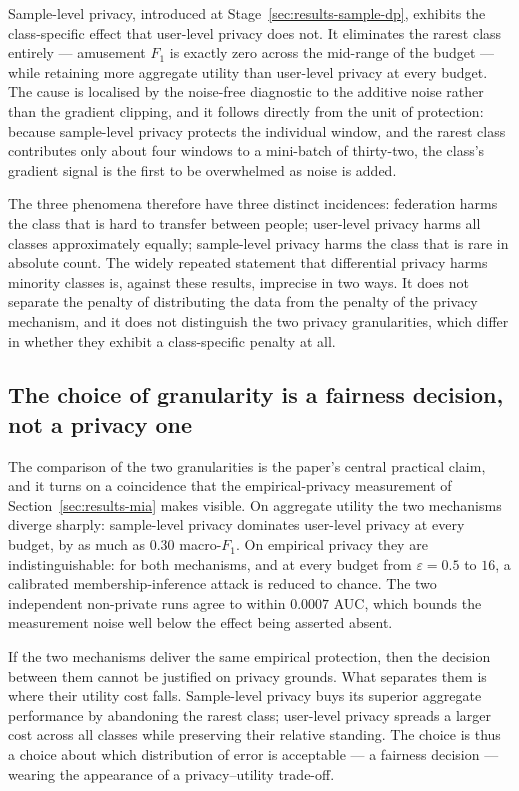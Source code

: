 Sample-level privacy, introduced at Stage~\ref{sec:results-sample-dp}, exhibits
the class-specific effect that user-level privacy does not. It eliminates the
rarest class entirely --- amusement $F_1$ is exactly zero across the mid-range of
the budget --- while retaining more aggregate utility than user-level privacy at
every budget. The cause is localised by the noise-free diagnostic to the additive
noise rather than the gradient clipping, and it follows directly from the unit of
protection: because sample-level privacy protects the individual window, and the
rarest class contributes only about four windows to a mini-batch of thirty-two,
the class's gradient signal is the first to be overwhelmed as noise is added.

The three phenomena therefore have three distinct incidences: federation harms
the class that is hard to transfer between people; user-level privacy harms all
classes approximately equally; sample-level privacy harms the class that is rare
in absolute count. The widely repeated statement that differential privacy harms
minority classes is, against these results, imprecise in two ways. It does not
separate the penalty of distributing the data from the penalty of the privacy
mechanism, and it does not distinguish the two privacy granularities, which
differ in whether they exhibit a class-specific penalty at all.

\subsection{The choice of granularity is a fairness decision, not a privacy one}
\label{sec:disc-fairness}

The comparison of the two granularities is the paper's central practical claim,
and it turns on a coincidence that the empirical-privacy measurement of
Section~\ref{sec:results-mia} makes visible. On aggregate utility the two
mechanisms diverge sharply: sample-level privacy dominates user-level privacy at
every budget, by as much as $0.30$ macro-$F_1$. On empirical privacy they are
indistinguishable: for both mechanisms, and at every budget from
$\varepsilon = 0.5$ to $16$, a calibrated membership-inference attack is reduced
to chance. The two independent non-private runs agree to within $0.0007$ AUC,
which bounds the measurement noise well below the effect being asserted absent.

If the two mechanisms deliver the same empirical protection, then the decision
between them cannot be justified on privacy grounds. What separates them is
where their utility cost falls. Sample-level privacy buys its superior aggregate
performance by abandoning the rarest class; user-level privacy spreads a larger
cost across all classes while preserving their relative standing. The choice is
thus a choice about which distribution of error is acceptable --- a fairness
decision --- wearing the appearance of a privacy--utility trade-off.

